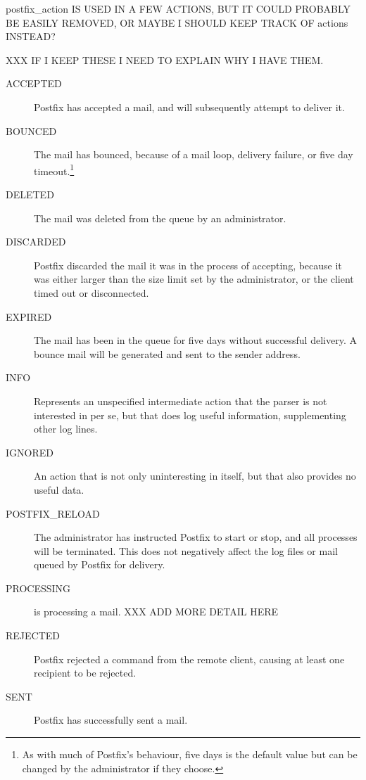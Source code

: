postfix\_action IS USED IN A FEW ACTIONS, BUT IT COULD PROBABLY BE EASILY
REMOVED, OR MAYBE I SHOULD KEEP TRACK OF actions INSTEAD\@?

XXX IF I KEEP THESE I NEED TO EXPLAIN WHY I HAVE THEM\@.

\begin{description}

    \item [ACCEPTED] Postfix has accepted a mail, and will
        subsequently attempt to deliver it.

    \item [BOUNCED] The mail has bounced, because of a mail loop,
        delivery failure, or five day timeout.\footnote{As with
        much of Postfix's behaviour, five days is the default value
        but can be changed by the administrator if they choose.}

    \item [DELETED] The mail was deleted from the queue by an
        administrator.

    \item [DISCARDED] Postfix discarded the mail it was in the
        process of accepting, because it was either larger than the
        size limit set by the administrator, or the client timed
        out or disconnected.

    \item [EXPIRED] The mail has been in the queue for five days without
        successful delivery.  A bounce mail will be generated and sent to
        the sender address.

    \item [INFO] Represents an unspecified intermediate action that
        the parser is not interested in per se, but that does log
        useful information, supplementing other log lines.

    \item [IGNORED] An action that is not only uninteresting in
        itself, but that also provides no useful data.

    \item [POSTFIX\_RELOAD] The administrator has instructed
        Postfix to start or stop, and all  processes
        will be terminated.  This does not negatively affect the
        log files or mail queued by Postfix for delivery.

    \item [PROCESSING]  is processing a mail.
        XXX ADD MORE DETAIL HERE

    \item [REJECTED] Postfix rejected a command from the remote
        client, causing at least one recipient to be rejected.

    \item [SENT] Postfix has successfully sent a mail.

\end{description}

